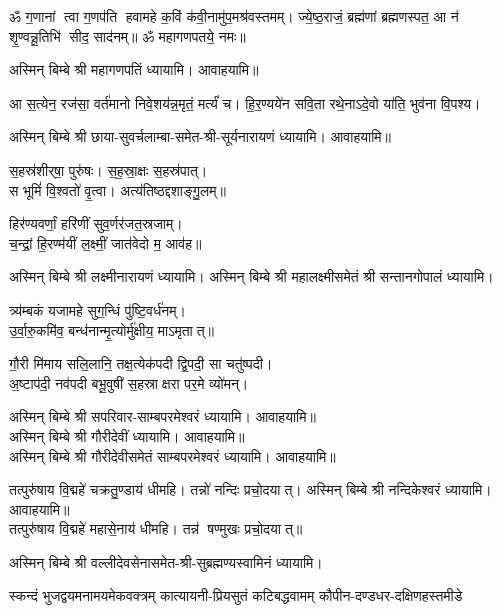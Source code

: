 



\begin{center}

ॐ ग॒णानां त्वा ग॒णप॑ति हवामहे क॒विं क॑वी॒नामु॑प॒मश्र॑\-वस्तमम्। 
ज्ये॒ष्ठ॒राजं॒ ब्रह्म॑णां ब्रह्मणस्पत॒ आ न॑ शृ॒ण्वन्नू॒तिभि॑ सीद॒ साद॑नम्॥ 
ॐ महागणपतये॒ नमः॥ 

अस्मिन् बिम्बे श्री महागणपतिं ध्यायामि। आवाहयामि॥

आ स॒त्येन॒ रज॑सा॒ वर्त॑मानो निवे॒शय॑न्न॒मृतं॒ मर्त्यं॑ च। हि॒र॒ण्यये॑न सवि॒ता रथे॒नाऽदे॒वो या॑ति॒ भुव॑ना वि॒पश्य\sn{}।

अस्मिन् बिम्बे श्री छाया-सुवर्चलाम्बा-समेत-श्री-सूर्यनारायणं ध्यायामि। आवाहयामि॥


स॒हस्र॑शीर्‌षा॒ पुरु॑षः। स॒ह॒स्रा॒क्षः स॒हस्र॑पात्।\\
स भूमिं॑ वि॒श्वतो॑ वृ॒त्वा। अत्य॑तिष्ठद्दशाङ्गु॒लम्॥

हिर॑ण्यवर्णां॒ हरि॑णीं सुव॒र्णर॑जत॒स्रजाम्।\\
च॒न्द्रां॒ हि॒रण्म॑यीं ल॒क्ष्मीं॒ जात॑वेदो म॒ आव॑ह॥

अस्मिन् बिम्बे श्री लक्ष्मीनारायणं ध्यायामि।
अस्मिन् बिम्बे श्री महालक्ष्मीसमेतं श्री सन्तानगोपालं ध्यायामि।

त्र्य॑म्बकं यजामहे सुग॒न्धिं पु॑ष्टि॒वर्ध॑नम्।\\
उ॒र्वा॒रु॒कमि॑व॒ बन्ध॑नान्मृ॒त्योर्मु॑क्षीय॒ माऽमृतात्॥

गौ॒री मि॑माय सलि॒लानि॒ तक्ष॒त्येक॑पदी द्वि॒पदी॒ सा चतु॑ष्पदी।\\
अ॒ष्टाप॑दी॒ नव॑पदी बभू॒वुषी॑ स॒हस्राक्षरा पर॒मे व्यो॑मन्।

अस्मिन् बिम्बे श्री सपरिवार-साम्बपरमेश्वरं ध्यायामि। आवाहयामि॥\\
अस्मिन् बिम्बे श्री गौरीदेवीं ध्यायामि। आवाहयामि॥\\
अस्मिन् बिम्बे श्री गौरीदेवीसमेतं साम्बपरमेश्वरं ध्यायामि। आवाहयामि॥

तत्पुरु॑षाय वि॒द्महे॑ चक्रतु॒ण्डाय॑ धीमहि। तन्नो॑ नन्दिः प्रचो॒दयात्। 
अस्मिन् बिम्बे श्री नन्दिकेश्वरं ध्यायामि। आवाहयामि॥\\

तत्पुरु॑षाय वि॒द्महे॑ महासे॒नाय॑ धीमहि। तन्न॑ षण्मुखः प्रचो॒दयात्॥

अस्मिन् बिम्बे श्री वल्लीदेवसेनासमेत-श्री-सुब्रह्मण्यस्वामिनं ध्यायामि। 

{स्कन्दं भुजद्वयमनामयमेकवक्त्रम्}
{कात्यायनी-प्रियसुतं कटिबद्धवामम्}
{कौपीन-दण्डधर-दक्षिणहस्तमीडे}


\end{center}

